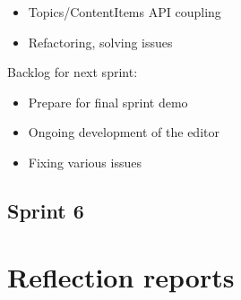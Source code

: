 \documentclass[10pt,a4paper]{article}
\begin{document}
\begin{appendices}
{        \begin{itemize}
          \item Topics/ContentItems API coupling
          \item Refactoring, solving issues
        \end{itemize}

        Backlog for next sprint:

        \begin{itemize}
          \item Prepare for final sprint demo
          \item Ongoing development of the editor
          \item Fixing various issues
        \end{itemize}

      \subsection*{Sprint 6}

    }

    \section{Reflection reports}
  \end{appendices}
\end{document}
